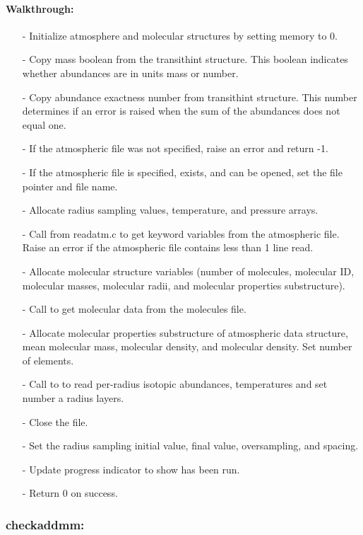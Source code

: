 \documentclass[letterpaper,12pt]{article}
\begin{document}
\paragraph{Walkthrough:}
\begin{enumerate}[leftmargin=10pt, noitemsep, parsep=0pt, topsep=0ex]
\item[-] Initialize atmosphere and molecular structures by setting memory to 0.
\item[-] Copy mass boolean from the transithint structure. This boolean indicates whether abundances are in units mass or number.
\item[-] Copy abundance exactness number from transithint structure. This number determines if an error is raised when the sum of the abundances does not equal one.
\item[-] If the atmospheric file was not specified, raise an error and return -1.
\item[-] If the atmospheric file is specified, exists, and can be opened, set the file pointer and file name.
\item[-] Allocate radius sampling values, temperature, and pressure arrays.
\item[-] Call  from readatm.c to get keyword variables from the atmospheric file. Raise an error if the atmospheric file contains less than 1 line read.
\item[-] Allocate molecular structure variables (number of molecules, molecular ID, molecular masses, molecular radii, and molecular properties substructure).
\item[-] Call  to get molecular data from the molecules file.
\item[-] Allocate molecular properties substructure of atmospheric data structure, mean molecular mass, molecular density, and molecular density. Set number of elements.
\item[-] Call to  to read per-radius isotopic abundances, temperatures and set number a radius layers.
\item[-] Close the file.
\item[-] Set the radius sampling initial value, final value, oversampling, and spacing.
\item[-] Update progress indicator to show  has been run.
\item[-] Return 0 on success.
\end{enumerate}

\subsubsection{checkaddmm:}
\end{document}
